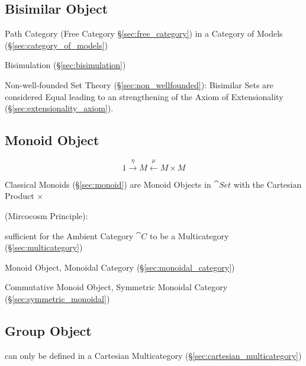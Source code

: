 \subsection{Bisimilar Object}\label{sec:bisimilar_object}

Path Category (Free Category \S\ref{sec:free_category}) in a Category
of Models (\S\ref{sec:category_of_models})

Bisimulation (\S\ref{sec:bisimulation})

Non-well-founded Set Theory (\S\ref{sec:non_wellfounded}): Bisimilar
Sets are considered Equal leading to an strengthening of the Axiom of
Extensionality (\S\ref{sec:extensionality_axiom}).



\subsection{Monoid Object}\label{sec:monoid_object}

\[
  1 \xrightarrow{\eta} M \xleftarrow{\mu} M \times M
\]

Classical Monoids (\S\ref{sec:monoid}) are Monoid Objects in
$\cat{Set}$ with the Cartesian Product $\times$

(Mircocosm Principle): %

sufficient for the Ambient Category $\cat{C}$ to be a Multicategory
(\S\ref{sec:multicategory})

Monoid Object, Monoidal Category (\S\ref{sec:monoidal_category})

Commutative Monoid Object, Symmetric Monoidal Category
(\S\ref{sec:symmetric_monoidal})



\subsection{Group Object}\label{sec:group_object}

can only be defined in a Cartesian Multicategory
(\S\ref{sec:cartesian_multicategory})



